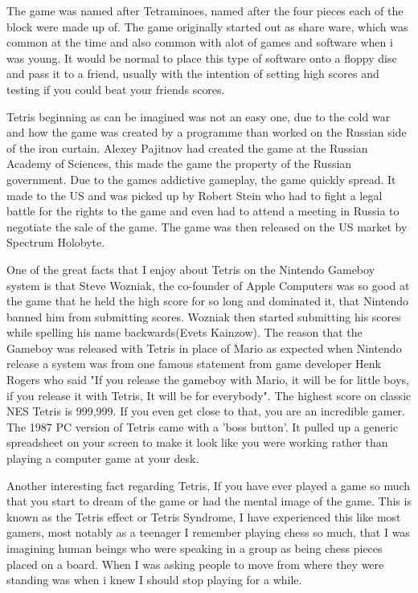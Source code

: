 \documentclass{article}
\begin{document}
The game was named after Tetraminoes, named after the four pieces each of the block were made up of. The game originally started out as share ware, which was common at the time and also common with alot of games and software when i was young. It would be normal to place this type of software onto a floppy disc and pass it to a friend, usually with the intention of setting high scores and testing if you could beat your friends scores. \newline

Tetris beginning as can be imagined was not an easy one, due to the cold war and how the game was created by a programme than worked on the Russian side of the iron curtain. Alexey Pajitnov had created the game at the Russian Academy of Sciences, this made the game the property of the Russian government. Due to the games addictive gameplay, the game quickly spread. It made to the US and was picked up by Robert Stein who had to fight a legal battle for the rights to the game and even had to attend a meeting in Russia to negotiate the sale of the game. The game was then released on the US market by Spectrum Holobyte. \newline

One of the great facts that I enjoy about Tetris on the Nintendo Gameboy system is that Steve Wozniak, the co-founder of Apple Computers was so good at the game that he held the high score for so long and dominated it, that Nintendo banned him from submitting scores. Wozniak then started submitting his scores while spelling his name backwards(Evets Kainzow). The reason that the Gameboy was released with Tetris in place of Mario as expected when Nintendo release a system was from one famous statement from game developer Henk Rogers who said "If you release the gameboy with Mario, it will be for little boys, if you release it with Tetris, It will be for everybody". The highest score on classic NES Tetris is 999,999. If you even get close to that, you are an incredible gamer. The 1987 PC version of Tetris came with a 'boss button'. It pulled up a generic spreadsheet on your screen to make it look like you were working rather than playing a computer game at your desk. \newline

Another interesting fact regarding Tetris, If you have ever played a game so much that you start to dream of the game or had the mental image of the game. This is known as the Tetris effect or Tetris Syndrome, I have experienced this like most gamers, most notably as a teenager I remember playing chess so much, that I was imagining human beings who were speaking in a group as being chess pieces placed on a board. When I was asking people to move from where they were standing was when i knew I should stop playing for a while. \newline
\clearpage
\end{document}
